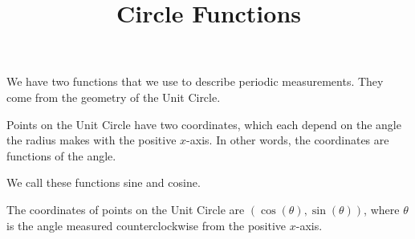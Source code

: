 \documentclass{ximera}
\title{Circle Functions}
\begin{document}
\begin{abstract}

\end{abstract}
\maketitle



We have two functions that we use to describe periodic measurements.  They come from the geometry of the Unit Circle.


Points on the Unit Circle have two coordinates, which each depend on the angle the radius makes with the positive $x$-axis.  In other words, the coordinates are functions of the angle.  

We call these functions sine and cosine.

The coordinates of points on the Unit Circle are $( \cos(\theta), \sin(\theta) )$, where $\theta$ is the angle measured counterclockwise from the positive $x$-axis.
\end{document}
